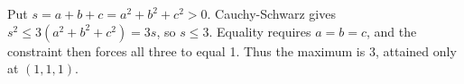 Put $s=a+b+c=a^2+b^2+c^2>0$. Cauchy-Schwarz gives $s^2\le3(a^2+b^2+c^2)=3s$, so $s\le3$. Equality requires $a=b=c$, and the constraint then forces all three to equal 1. Thus the maximum is $\boxed3$, attained only at $(1,1,1)$.
